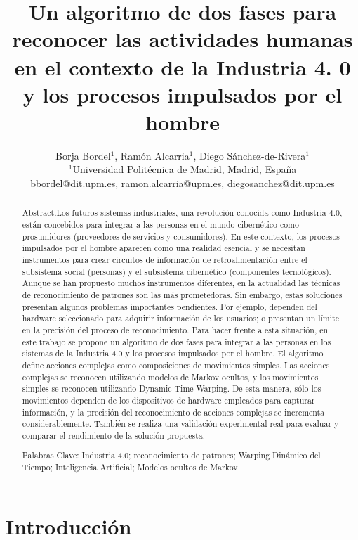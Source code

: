\documentclass[a4paper]{article}
\title{Un algoritmo de dos fases para reconocer las actividades humanas en el contexto de la Industria 4. 0 y los procesos impulsados por el hombre}
\author{Borja Bordel$^1$, Ramón Alcarria$^1$, Diego Sánchez-de-Rivera$^1$\\
  \small $^1$Universidad Politécnica de Madrid, Madrid, España\\
  \small bbordel@dit.upm.es, ramon.alcarria@upm.es, diegosanchez@dit.upm.es\\
  \date{}
}
\begin{document}
\maketitle

\begin{abstract}
\centering
Abstract.Los futuros sistemas industriales, una revolución conocida como Industria 4.0, están concebidos para integrar a las personas en el mundo cibernético como prosumidores (proveedores de servicios y consumidores). En este contexto, los procesos impulsados por el hombre aparecen como una realidad esencial y se necesitan instrumentos para crear circuitos de información de retroalimentación entre el subsistema social (personas) y el subsistema cibernético (componentes tecnológicos). Aunque se han propuesto muchos instrumentos diferentes, en la actualidad las técnicas de reconocimiento de patrones son las más prometedoras. Sin embargo, estas soluciones presentan algunos problemas importantes pendientes. Por ejemplo, dependen del hardware seleccionado para adquirir información de los usuarios; o presentan un límite en la precisión del proceso de reconocimiento. Para hacer frente a esta situación, en este trabajo se propone un algoritmo de dos fases para integrar a las personas en los sistemas de la Industria 4.0 y los procesos impulsados por el hombre. El algoritmo define acciones complejas como composiciones de movimientos simples. Las acciones complejas se reconocen utilizando modelos de Markov ocultos, y los movimientos simples se reconocen utilizando Dynamic Time Warping. De esta manera, sólo los movimientos dependen de los dispositivos de hardware empleados para capturar información, y la precisión del reconocimiento de acciones complejas se incrementa considerablemente. También se realiza una validación experimental real para evaluar y comparar el rendimiento de la solución propuesta.

Palabras Clave: Industria 4.0; reconocimiento de patrones; Warping Dinámico del Tiempo; Inteligencia Artificial; Modelos ocultos de Markov
\end{abstract}

\section{Introducci\'on}
\end{document}
